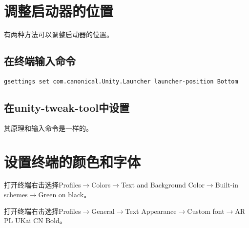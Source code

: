 \documentclass[a4paper,12pt]{ctexart}
\begin{document}
\newpage
\section{调整启动器的位置}
有两种方法可以调整启动器的位置。
\subsection{在终端输入命令}
\begin{verbatim}
gsettings set com.canonical.Unity.Launcher launcher-position Bottom
\end{verbatim}
\subsection{在unity-tweak-tool中设置}
其原理和输入命令是一样的。
\newpage
\section{设置终端的颜色和字体}
打开终端右击选择Profiles$\rightarrow$Colors$\rightarrow$Text and Background Color$\rightarrow$Built-in schemes$\rightarrow$Green on black。

打开终端右击选择Profiles$\rightarrow$General$\rightarrow$Text Appearance$\rightarrow$Custom font$\rightarrow$AR PL UKai CN Bold。
\end{document}
